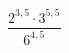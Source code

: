\begin{ex}
	\begin{condition}
		\( \dfrac{2^{3,5}\cdot3^{5,5}}{6^{4,5}} \)
	\end{condition}
\end{ex}